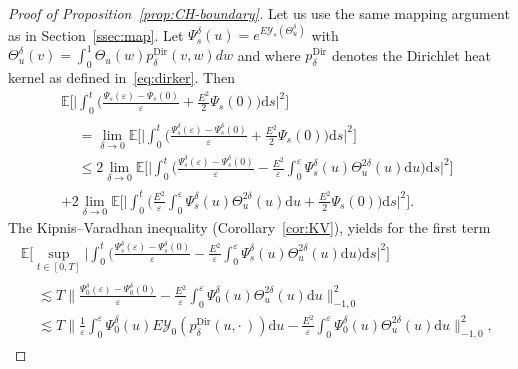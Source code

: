 \documentclass[10pt]{amsart}
\theoremstyle{definition}\newtheorem{defi}[theo]{Definition}\newtheorem{rema}[theo]{Remark}\newtheorem{exam}[theo]{Example}\newtheorem{exem}[theo]{Example}\newtheorem{nota}[theo]{Notation}
\DeclareMathOperator{\Dir}{Dir}
\newcommand{\mc}[1]{{\mathcal #1}}
\renewcommand{\mc}[1]{{\mathcal #1}}
\renewcommand{\leq}{\leqslant}
\newcommand*{\dd}{\mathrm{d}}
\newcommand*{\ds}{\dd s}
\newcommand*{\du}{\dd u}
\begin{document}
\begin{proof}[Proof of Proposition~\ref{prop:CH-boundary}]
Let us use the same mapping argument as in Section~\ref{ssec:map}. Let $\Psi_s^\delta(u) = e^{E \mc Y_s(\Theta^\delta_u)}$ with $\Theta^\delta_u(v) = \int_0^1 \Theta_u(w) p_\delta^{\Dir}(v,w) dw$ and where $p_\delta^{\Dir}$ denotes the Dirichlet heat kernel as defined in~\eqref{eq:dirker}. Then
\begin{multline}\label{eq:CH-boundary-pr1}
\mathbb{E} \bigg[\bigg| \int_0^t \bigg(\frac{\Psi_s (\varepsilon) - \Psi_s(0)}{\varepsilon} + \frac{E^2}{2} \Psi_s(0) \bigg) \ds \bigg|^2 \bigg] \\
\begin{aligned}
& = \lim_{\delta \to 0} \mathbb{E} \bigg[\bigg| \int_0^t \bigg(\frac{\Psi^\delta_s (\varepsilon) - \Psi^\delta_s(0)}{\varepsilon} + \frac{E^2}{2} \Psi_s(0) \bigg) \ds \bigg|^2 \bigg] \\
& \leq 2 \lim_{\delta \to 0}\mathbb{E} \bigg[\bigg| \int_0^t \bigg(\frac{\Psi^\delta_s (\varepsilon) - \Psi^\delta_s(0)}{\varepsilon} - \frac{E^2}{\varepsilon} \int_0^\varepsilon \Psi^\delta_s(u) \Theta^{2\delta}_u(u) \du \bigg) \ds \bigg|^2 \bigg]
\end{aligned} \\
+ 2 \lim_{\delta \to 0} \mathbb{E} \bigg[\bigg| \int_0^t \bigg(\frac{E^2}{\varepsilon} \int_0^\varepsilon \Psi^\delta_s(u) \Theta^{2\delta}_u(u) \du + \frac{E^2}{2} \Psi_s(0) \bigg) \ds \bigg|^2 \bigg].
\end{multline}
The Kipnis--Varadhan inequality (Corollary~\ref{cor:KV}), yields for the first term
\begin{multline*}
\mathbb{E} \bigg[\sup_{t \in [0,T]} \bigg| \int_0^t \bigg(\frac{\Psi^\delta_s (\varepsilon) - \Psi^\delta_s(0)}{\varepsilon} - \frac{E^2}{\varepsilon} \int_0^\varepsilon \Psi^\delta_s(u) \Theta^{2\delta}_u(u) \du \bigg)\ds \bigg|^2 \bigg] \\
\begin{aligned}
& \lesssim T \bigg\| \frac{\Psi^\delta_0 (\varepsilon) - \Psi^\delta_0(0)}{\varepsilon} - \frac{E^2}{\varepsilon} \int_0^\varepsilon \Psi^\delta_0(u) \Theta^{2\delta}_u(u) \du \bigg\|_{-1,0}^2 \\
& \lesssim T \bigg\| \frac{1}{\varepsilon} \int_0^\varepsilon \Psi^\delta_0 (u) E \mc Y_0(p^{\Dir}_\delta(u,\cdot\,)) \du - \frac{E^2}{\varepsilon} \int_0^\varepsilon \Psi^\delta_0(u) \Theta^{2\delta}_u(u) \du \bigg\|_{-1,0}^2,
\end{aligned}
\end{multline*}

\end{proof}
\end{document}
